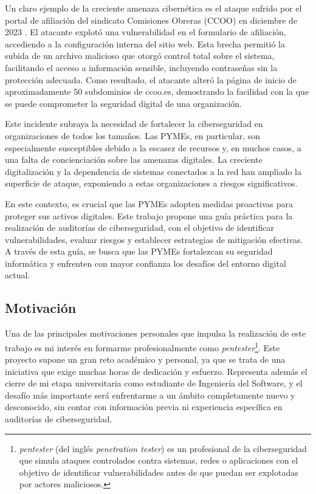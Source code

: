 \documentclass[a4paper, 11pt]{article}
\begin{document}
Un claro ejemplo de la creciente amenaza cibernética es el ataque sufrido por el portal de afiliación del sindicato Comisiones Obreras (CCOO) en diciembre de 2023 \cite{napalm-ccoo}. El atacante explotó una vulnerabilidad en el formulario de afiliación, accediendo a la configuración interna del sitio web. Esta brecha permitió la subida de un archivo malicioso que otorgó control total sobre el sistema, facilitando el acceso a información sensible, incluyendo contraseñas sin la protección adecuada. Como resultado, el atacante alteró la página de inicio de aproximadamente 50 subdominios de ccoo.es, demostrando la facilidad con la que se puede comprometer la seguridad digital de una organización.


Este incidente subraya la necesidad de fortalecer la ciberseguridad en organizaciones de todos los tamaños. Las PYMEs, en particular, son especialmente susceptibles debido a la escasez de recursos y, en muchos casos, a una falta de concienciación sobre las amenazas digitales. 
La creciente digitalización y la dependencia de sistemas conectados a la red han ampliado la superficie de ataque, exponiendo a estas organizaciones a riesgos significativos.


En este contexto, es crucial que las PYMEs adopten medidas proactivas para proteger sus activos digitales. Este trabajo propone una guía práctica para la realización de auditorías de ciberseguridad, con el objetivo de identificar vulnerabilidades, evaluar riesgos y establecer 
estrategias de mitigación efectivas. A través de esta guía, se busca que las PYMEs fortalezcan su seguridad informática y enfrenten con mayor confianza los desafíos del entorno digital actual.



\subsection{Motivación}


Una de las principales motivaciones personales que impulsa la realización de este trabajo es mi interés en formarme profesionalmente como \textit{pentester}\footnote{\textit{pentester} (del inglés \textit{penetration tester}) es un profesional de la ciberseguridad que simula ataques controlados contra sistemas, redes o aplicaciones con el objetivo de identificar vulnerabilidades antes de que puedan ser explotadas por actores maliciosos.}. Este proyecto supone un gran reto académico y personal, ya que se trata de una iniciativa que exige muchas horas de dedicación y esfuerzo. Representa además el cierre de mi etapa universitaria como estudiante de Ingeniería del Software, y el desafío más importante será enfrentarme a un ámbito completamente nuevo y desconocido, sin contar con información previa ni experiencia específica en auditorías de ciberseguridad. 
\end{document}
